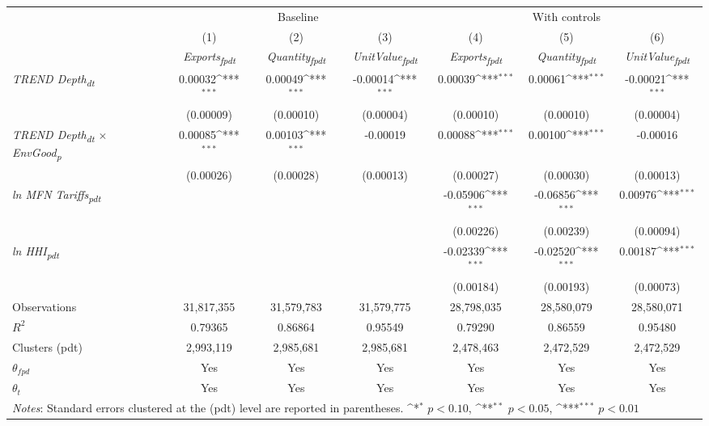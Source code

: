 {
\def\sym#1{\ifmmode^{#1}\else\(^{#1}\)\fi}
\begin{tabular}{l*{6}{c}}
\toprule
&\multicolumn{3}{c}{Baseline}&\multicolumn{3}{c}{With controls}\\\cmidrule(lr){2-4}\cmidrule(lr){5-7}
&(1)&(2)&(3)&(4)&(5)&(6)\\
&\textit{Exports\textsubscript{fpdt}}&\textit{Quantity\textsubscript{fpdt}}&\textit{UnitValue\textsubscript{fpdt}}&\textit{Exports\textsubscript{fpdt}}&\textit{Quantity\textsubscript{fpdt}}&\textit{UnitValue\textsubscript{fpdt}}\\
\midrule
\textit{TREND Depth\textsubscript{dt}} & 0.00032\sym{***} & 0.00049\sym{***} & -0.00014\sym{***} & 0.00039\sym{***} & 0.00061\sym{***} & -0.00021\sym{***}\\
 & (0.00009) & (0.00010) & (0.00004) & (0.00010) & (0.00010) & (0.00004)\\
\addlinespace
\textit{TREND Depth\textsubscript{dt} $\times$ EnvGood\textsubscript{p}} & 0.00085\sym{***} & 0.00103\sym{***} & -0.00019 & 0.00088\sym{***} & 0.00100\sym{***} & -0.00016\\
 & (0.00026) & (0.00028) & (0.00013) & (0.00027) & (0.00030) & (0.00013)\\
\addlinespace
\textit{ln MFN Tariffs\textsubscript{pdt}} &  &  &  & -0.05906\sym{***} & -0.06856\sym{***} & 0.00976\sym{***}\\
 &  &  &  & (0.00226) & (0.00239) & (0.00094)\\
\addlinespace
\textit{ln HHI\textsubscript{pdt}} &  &  &  & -0.02339\sym{***} & -0.02520\sym{***} & 0.00187\sym{***}\\
 &  &  &  & (0.00184) & (0.00193) & (0.00073)\\
\midrule
Observations & 31,817,355 & 31,579,783 & 31,579,775 & 28,798,035 & 28,580,079 & 28,580,071\\
$R^{2}$ & 0.79365 & 0.86864 & 0.95549 & 0.79290 & 0.86559 & 0.95480\\
Clusters (pdt) & 2,993,119 & 2,985,681 & 2,985,681 & 2,478,463 & 2,472,529 & 2,472,529\\
$\theta_{fpd}$ & Yes & Yes & Yes & Yes & Yes & Yes\\
$\theta_{t}$ & Yes & Yes & Yes & Yes & Yes & Yes\\
\bottomrule
\multicolumn{7}{l}{\footnotesize \textit{Notes}: Standard errors clustered at the (pdt) level are reported in parentheses. \sym{*} \(p<0.10\), \sym{**} \(p<0.05\), \sym{***} \(p<0.01\)}\\
\end{tabular}
}
